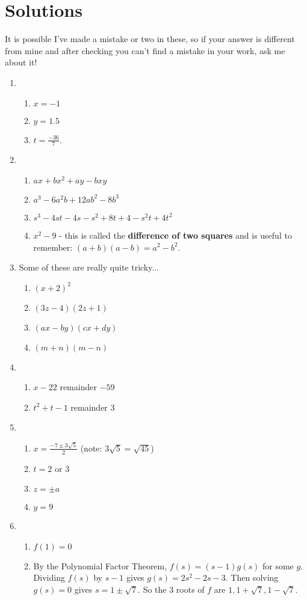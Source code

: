 \documentclass{article}
\begin{document}
\clearpage

\section{Solutions}

It is possible I've made a mistake or two in these, so if your answer is different from mine and after checking you can't find a mistake in your work, ask me about it!

\begin{enumerate}
\item 
	\begin{enumerate}
	\item $x=-1$
	\item $y=1.5$
	\item $t=\frac{-36}{7}$.
	\end{enumerate}
\item
	\begin{enumerate}
	\item $ax + bx^2+ay - bxy$
	\item $a^3-6a^2b+12ab^2-8b^3$
	\item $s^3-4st-4s-s^2+8t+4-s^2t+4t^2$
	\item $x^2-9$ - this is called the {\bf difference of two squares} and is useful to remember: $(a+b)(a-b)=a^2-b^2$.
	\end{enumerate}
\item Some of these are really quite tricky...
	\begin{enumerate}
	\item $(x+2)^2$
	\item $(3z-4)(2z+1)$
	\item $(ax-by)(cx+dy)$
	\item $(m+n)(m-n)$
	\end{enumerate}
\item
	\begin{enumerate}
	\item $x-22$ remainder $-59$
	\item $t^2+t-1$ remainder 3
	\end{enumerate}
\item
	\begin{enumerate}
	\item $x = \frac{-7\pm 3\sqrt{5}}{2}$ (note: $3\sqrt{5}=\sqrt{45}$)
	\item $t=2$ or $3$
	\item $z=\pm a$
	\item $y=9$
	\end{enumerate}
\item
	\begin{enumerate}
	\item $f(1)=0$
	\item By the Polynomial Factor Theorem, $f(s)=(s-1)g(s)$ for some $g$. Dividing $f(s)$ by $s-1$ gives $g(s)=2s^2-2s-3$. Then solving $g(s)=0$ gives $s=1\pm\sqrt{7}$. So the 3 roots of $f$ are $1, 1+\sqrt{7}, 1-\sqrt{7}$.
	\end{enumerate}
\end{enumerate}
\end{document}
